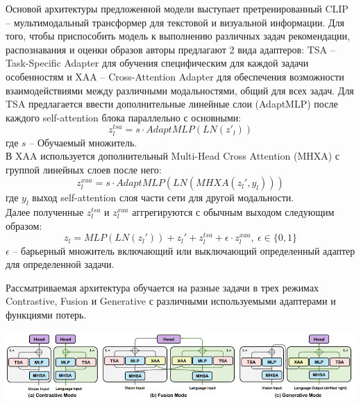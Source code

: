\documentclass[a4paper,12pt]{article}
\begin{document}
Основой архитектуры предложенной модели выступает претренированный CLIP -- мультимодальный трансформер для текстовой и визуальной информации. Для того, чтобы приспособить модель к выполнению различных задач рекомендации, распознавания и оценки образов авторы предлагают 2 вида адаптеров: TSA -- Task-Specific Adapter для обучения специфическим для каждой задачи особенностям и XAA -- Cross-Attention Adapter для обеспечения возможности взаимодействиями между различными модальностями, общий для всех задач. Для TSA предлагается ввести дополнительные линейные слои (AdaptMLP) после каждого self-attention блока параллельно с основными:
$$z_l^{tsa}=s \cdot AdaptMLP(LN(z'_l))$$
где $s$ -- Обучаемый множитель.\\
В XAA используется дополнительный Multi-Head Cross Attention (MHXA) с группой линейных слоев после него:
$$z_l^{xaa} = s\cdot AdaptMLP(LN(MHXA(z_l',y_l)))$$
где $y_l$ выход self-attention слоя части сети для другой модальности.\\
Далее полученные $z_l^{tsa}$ и $z_l^{xaa}$ аггрегируются с обычным выходом следующим образом:
$$z_l = MLP(LN(z_l')) + z_l'+z_l^{tsa}+\epsilon\cdot z_l^{xaa},~\epsilon\in\{0,1\}$$
$\epsilon$ -- барьерный множитель включающий или выключающий определенный адаптер для определенной задачи. 

Рассматриваемая архитектура обучается на разные задачи в трех режимах Contrastive, Fusion и Generative с различными используемыми адаптерами и функциями потерь. 

\includegraphics[scale = 0.7]{FAME-ViL_modes.png}
\end{document}
